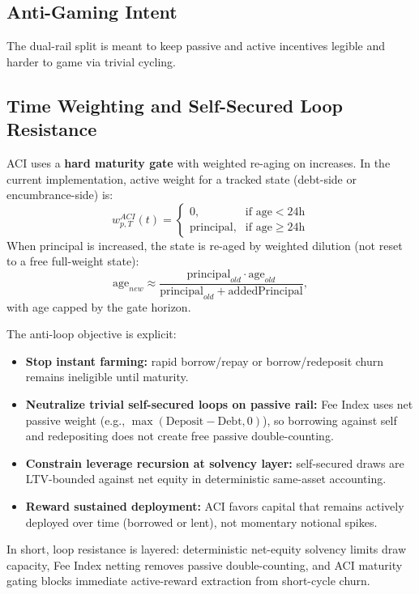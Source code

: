 \documentclass[version=preprint]{iacrcc}
\begin{document}
\subsection{Anti-Gaming Intent}

The dual-rail split is meant to keep passive and active incentives legible and harder to game via trivial cycling.

\subsection{Time Weighting and Self-Secured Loop Resistance}

ACI uses a \textbf{hard maturity gate} with weighted re-aging on increases. In the current implementation, active weight for a tracked state (debt-side or encumbrance-side) is:
\[
w^{ACI}_{p,T}(t)=
\begin{cases}
0, & \text{if age} < 24\text{h}\\
\text{principal}, & \text{if age} \ge 24\text{h}
\end{cases}
\]
When principal is increased, the state is re-aged by weighted dilution (not reset to a free full-weight state):
\[
\text{age}_{new}\approx
\frac{\text{principal}_{old}\cdot \text{age}_{old}}
{\text{principal}_{old}+\text{addedPrincipal}},
\]
with age capped by the gate horizon.

The anti-loop objective is explicit:
\begin{itemize}
  \item \textbf{Stop instant farming:} rapid borrow/repay or borrow/redeposit churn remains ineligible until maturity.
  \item \textbf{Neutralize trivial self-secured loops on passive rail:} Fee Index uses net passive weight (e.g., $\max(\text{Deposit}-\text{Debt},0)$), so borrowing against self and redepositing does not create free passive double-counting.
  \item \textbf{Constrain leverage recursion at solvency layer:} self-secured draws are LTV-bounded against net equity in deterministic same-asset accounting.
  \item \textbf{Reward sustained deployment:} ACI favors capital that remains actively deployed over time (borrowed or lent), not momentary notional spikes.
\end{itemize}

In short, loop resistance is layered: deterministic net-equity solvency limits draw capacity, Fee Index netting removes passive double-counting, and ACI maturity gating blocks immediate active-reward extraction from short-cycle churn.
\end{document}
